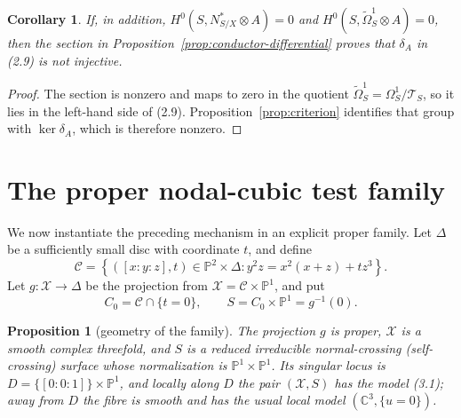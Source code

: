 \documentclass[11pt]{amsart}
\newcommand{\C}{\mathbb C}
\renewcommand{\P}{\mathbb P}
\theoremstyle{plain}
\newtheorem{proposition}[theorem]{Proposition}
\newtheorem{corollary}[theorem]{Corollary}
\theoremstyle{definition}
\theoremstyle{remark}
\begin{document}
\begin{corollary}
\label{cor:normal-crossing-kernel}
If, in addition, $H^0(S,N^*_{S/X}\otimes A)=0$ and
$H^0(S,\widetilde\Omega^1_S\otimes A)=0$, then the section in
Proposition~\ref{prop:conductor-differential} proves that $\delta_A$ in
(2.9) is not injective.
\end{corollary}

\begin{proof}
The section is nonzero and maps to zero in the quotient
$\widetilde\Omega^1_S=\Omega^1_S/\mathscr T_S$, so it
lies in the left-hand side of (2.9).  Proposition~\ref{prop:criterion}
identifies that group with $\ker\delta_A$, which is therefore nonzero.
\end{proof}

\section{The proper nodal-cubic test family}

We now instantiate the preceding mechanism in an explicit proper family.
Let $\Delta$ be a sufficiently small disc with coordinate $t$, and define
\[
 \mathscr C=
 \left\{([x:y:z],t)\in\P^2\times\Delta:
 y^2z=x^2(x+z)+tz^3\right\}.
 \tag{4.1}
\]
Let $g:\mathcal X\to\Delta$ be the projection from
$\mathcal X=\mathscr C\times\P^1$, and put
\[
 C_0=\mathscr C\cap\{t=0\},\qquad S=C_0\times\P^1=g^{-1}(0).
 \tag{4.2}
\]

\begin{proposition}[geometry of the family]
\label{prop:family-geometry}
The projection $g$ is proper, $\mathcal X$ is a smooth complex threefold,
  and $S$ is a reduced irreducible normal-crossing (self-crossing) surface whose normalization
is $\P^1\times\P^1$.  Its singular locus is
\(D=\{[0:0:1]\}\times\P^1\), and locally along $D$ the pair $(\mathcal X,S)$
has the model (3.1); away from $D$ the fibre is smooth and has the usual
local model $(\C^3,\{u=0\})$.
\end{proposition}
\end{document}
